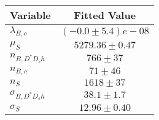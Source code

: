 \begin{tabular}[t]{lc}
\hline
Variable &Fitted Value\\
\hline\hline
$\lambda_{B,c}$&$(-0.0\pm5.4)e-08$\\
\hline
$\mu_S$&$5279.36\pm0.47$\\
\hline
$n_{B, D^* D_s h}$&$766\pm37$\\
\hline
$n_{B,c}$&$71\pm46$\\
\hline
$n_S$&$1618\pm37$\\
\hline
$\sigma_{B, D^* D_s h}$&$38.1\pm1.7$\\
\hline
$\sigma_S$&$12.96\pm0.40$\\
\hline
\end{tabular}